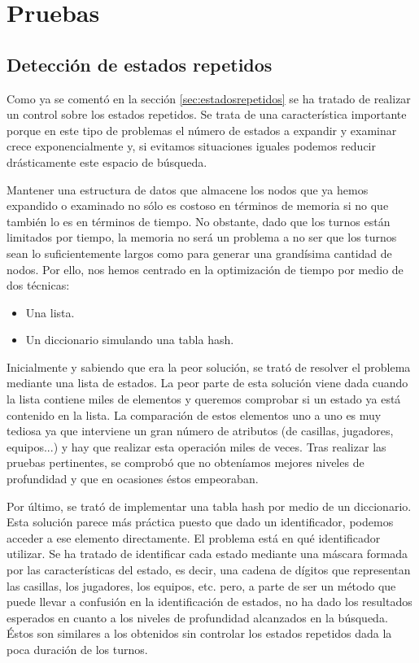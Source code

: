\chapter {Pruebas}
\label {pruebas}
\section {Detección de estados repetidos}
Como ya se comentó en la sección \ref{sec:estadosrepetidos} se ha
tratado de realizar un control sobre los estados repetidos. Se trata
de una característica importante porque en este tipo de problemas el
número de estados a expandir y examinar crece exponencialmente y, si
evitamos situaciones iguales podemos reducir drásticamente este
espacio de búsqueda.

Mantener una estructura de datos que almacene los nodos que ya hemos
expandido o examinado no sólo es costoso en términos de memoria si no
que también lo es en términos de tiempo. No obstante, dado que los
turnos están limitados por tiempo, la memoria no será un problema a no
ser que los turnos sean lo suficientemente largos como para generar
una grandísima cantidad de nodos. Por ello, nos hemos centrado en la
optimización de tiempo por medio de dos técnicas:
\begin{itemize}
\item Una lista.
\item Un diccionario simulando una tabla hash.
\end{itemize}

Inicialmente y sabiendo que era la peor solución, se trató de resolver
el problema mediante una lista de estados. La peor parte de esta
solución viene dada cuando la lista contiene miles de elementos y
queremos comprobar si un estado ya está contenido en la lista. La
comparación de estos elementos uno a uno es muy tediosa ya que
interviene un gran número de atributos (de casillas, jugadores,
equipos...) y hay que realizar esta operación miles de veces. Tras
realizar las pruebas pertinentes, se comprobó que no obteníamos
mejores niveles de profundidad y que en ocasiones éstos empeoraban.

Por último, se trató de implementar una tabla hash por medio de un
diccionario. Esta solución parece más práctica puesto que dado un
identificador, podemos acceder a ese elemento directamente. El
problema está en qué identificador utilizar. Se ha tratado de
identificar cada estado mediante una máscara formada por las
características del estado, es decir, una cadena de dígitos que
representan las casillas, los jugadores, los equipos, etc. pero, a
parte de ser un método que puede llevar a confusión en la
identificación de estados, no ha dado los resultados esperados en
cuanto a los niveles de profundidad alcanzados en la búsqueda. Éstos
son similares a los obtenidos sin controlar los estados repetidos dada
la poca duración de los turnos.

